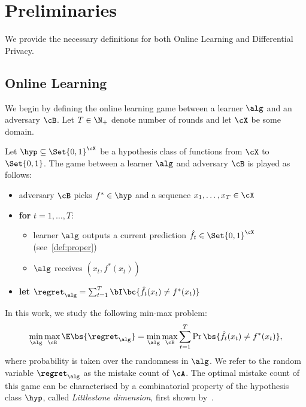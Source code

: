 \section{Preliminaries}\label{sec:prelim}
We provide the necessary definitions for both Online Learning and Differential Privacy. 
\subsection{Online Learning} We begin by defining the online learning game between a learner \(\alg\) and an adversary \(\cB\). Let \(T \in \N_+\) denote number of rounds and let \(\cX\) be some domain.
\begin{definition}
\label{def:general}
    Let  \(\hyp \subseteq \Set{0, 1}^{\cX}\) be a hypothesis class of functions from \(\cX\) to \(\Set{0, 1}\). The game between a learner \(\alg\) and adversary \(\cB\) is played as follows:
\begin{mdframed}[nobreak=true]
\begin{itemize}
    \item adversary \(\cB\) picks \(f^{\ast} \in \hyp\) and a sequence \(x_1, \ldots, x_T \in \cX\)
    \item \textbf{for} \(t = 1, \ldots, T\):
    \begin{itemize}
        \item learner \(\alg\) outputs a current prediction \(\hat f_t \in \Set{0, 1}^{\cX}\) (see~\cref{def:proper})
        \item \(\alg\) receives \((x_t, f^{\ast}(x_t))\)
    \end{itemize}
    \item \textbf{let} \(\regret_{\alg}  = \sum_{t = 1}^T \bI\bc{\hat f_t(x_t) \neq f^{\ast}(x_t)}\)
\end{itemize}
\end{mdframed}
\end{definition}
In this work, we study the following min-max problem:
\begin{equation}\label{eq:mistake-bound}
    \min_{\alg}\max_{\cB} \E \bs{\regret_{\alg}} = \min_{\alg} \max_{\cB} \sum_{t = 1}^T \Pr\bs{\hat f_t(x_t) \neq f^{\ast}(x_t)},
\end{equation}
where probability is taken over the randomness in \(\alg\). We refer to the random variable \(\regret_{\alg}\) as the mistake count of \(\cA\). The optimal mistake count of this game can be characterised by a combinatorial property of the hypothesis class \(\hyp\), called \emph{Littlestone dimension}, first shown by~\citet{littlestone1988learning}.

